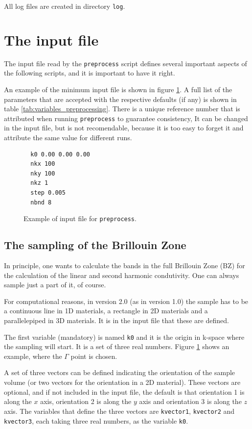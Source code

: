 \documentclass[a4paper,12pt]{report}
\begin{document}
All log files are created in directory \verb|log|.




 \section{The input file}

 The input file read by the \texttt{preprocess} script defines several important
 aspects of the following scripts, and it is important to have it right.

 An example of the minimum input file is shown in figure \ref{code:inputfile}.
 A full list of the parameters that are accepted with the respective defaults (if any)
 is shown in table \ref{tab:variables_preprocessing}.
 There is a unique reference number that is attributed when running \texttt{preprocess} to guarantee consistency,
 It can be changed in the input file, but is not recomendable,
 because it is too easy to forget it
 and attribute the same value for different runs.

\begin{figure}[h]
 \centering
\begin{verbatim}
  k0 0.00 0.00 0.00
  nkx 100
  nky 100
  nkz 1
  step 0.005
  nbnd 8
\end{verbatim}
\caption{Example of input file for \texttt{preprocess}.}
\label{code:inputfile}
\end{figure}

 \subsection{The sampling of the Brillouin Zone}

 In principle, one wants to calculate the bands in the full Brillouin Zone (BZ)
 for the calculation of the linear and second harmonic condutivity.
 One can always sample just a part of it, of course.

 For computational reasons, in version 2.0 (as in version 1.0) the sample has to be
 a continuous line in 1D materials, a rectangle in 2D materials and a parallelepiped in 3D materials.
 It is in the input file that these are defined.

 The first variable (mandatory) is named \verb|k0| and it is the origin in k-space
 where the sampling will start.
 It is a set of three real numbers.
 Figure \ref{code:inputfile} shows an example, where the $\Gamma$ point is chosen.

 A set of three vectors can be defined indicating the orientation of the sample volume
 (or two vectors for the orientation in a 2D material).
 These vectors are optional, and if not included in the input file,
 the default is that orientation 1 is along the $x$ axis, orientation 2 is along the $y$
 axis and orientation 3 is along the $z$ axis.
 The variables that define the three vectors are \verb|kvector1|, \verb|kvector2| and \verb|kvector3|,
 each taking three real numbers, as the variable \verb|k0|.
\end{document}
